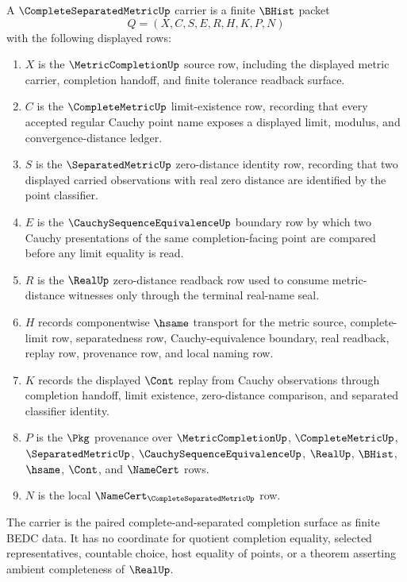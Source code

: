 \begin{definition}\label{def:complete-separated-metric-carrier}
A $\CompleteSeparatedMetricUp$ carrier is a finite $\BHist$ packet
$$
Q=(X,C,S,E,R,H,K,P,N)
$$
with the following displayed rows:
\begin{enumerate}
\item $X$ is the $\MetricCompletionUp$ source row, including the displayed metric carrier, completion handoff, and finite tolerance readback surface.
\item $C$ is the $\CompleteMetricUp$ limit-existence row, recording that every accepted regular Cauchy point name exposes a displayed limit, modulus, and convergence-distance ledger.
\item $S$ is the $\SeparatedMetricUp$ zero-distance identity row, recording that two displayed carried observations with real zero distance are identified by the point classifier.
\item $E$ is the $\CauchySequenceEquivalenceUp$ boundary row by which two Cauchy presentations of the same completion-facing point are compared before any limit equality is read.
\item $R$ is the $\RealUp$ zero-distance readback row used to consume metric-distance witnesses only through the terminal real-name seal.
\item $H$ records componentwise $\hsame$ transport for the metric source, complete-limit row, separatedness row, Cauchy-equivalence boundary, real readback, replay row, provenance row, and local naming row.
\item $K$ records the displayed $\Cont$ replay from Cauchy observations through completion handoff, limit existence, zero-distance comparison, and separated classifier identity.
\item $P$ is the $\Pkg$ provenance over $\MetricCompletionUp$, $\CompleteMetricUp$, $\SeparatedMetricUp$, $\CauchySequenceEquivalenceUp$, $\RealUp$, $\BHist$, $\hsame$, $\Cont$, and $\NameCert$ rows.
\item $N$ is the local $\NameCert_{\CompleteSeparatedMetricUp}$ row.
\end{enumerate}
The carrier is the paired complete-and-separated completion surface as finite BEDC data. It has no coordinate for quotient completion equality, selected representatives, countable choice, host equality of points, or a theorem asserting ambient completeness of $\RealUp$.
\end{definition}

